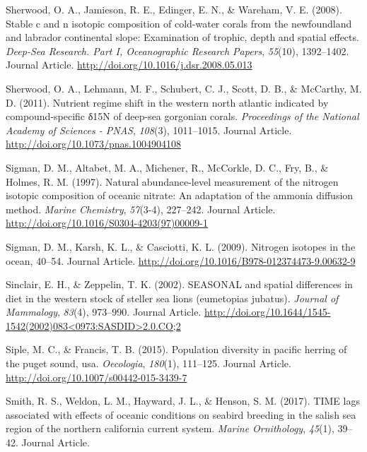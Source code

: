 \documentclass [11pt, proquest] {uwthesis}[2015/03/03]
\begin{document}
\hypertarget{ref-Sherwood2008}{}
Sherwood, O. A., Jamieson, R. E., Edinger, E. N., \& Wareham, V. E.
(2008). Stable c and n isotopic composition of cold-water corals from
the newfoundland and labrador continental slope: Examination of trophic,
depth and spatial effects. \emph{Deep-Sea Research. Part I,
Oceanographic Research Papers}, \emph{55}(10), 1392--1402. Journal
Article. \url{http://doi.org/10.1016/j.dsr.2008.05.013}

\hypertarget{ref-Sherwood2011}{}
Sherwood, O. A., Lehmann, M. F., Schubert, C. J., Scott, D. B., \&
McCarthy, M. D. (2011). Nutrient regime shift in the western north
atlantic indicated by compound-specific δ15N of deep-sea gorgonian
corals. \emph{Proceedings of the National Academy of Sciences - PNAS},
\emph{108}(3), 1011--1015. Journal Article.
\url{http://doi.org/10.1073/pnas.1004904108}

\hypertarget{ref-Sigman1997}{}
Sigman, D. M., Altabet, M. A., Michener, R., McCorkle, D. C., Fry, B.,
\& Holmes, R. M. (1997). Natural abundance-level measurement of the
nitrogen isotopic composition of oceanic nitrate: An adaptation of the
ammonia diffusion method. \emph{Marine Chemistry}, \emph{57}(3-4),
227--242. Journal Article.
\url{http://doi.org/10.1016/S0304-4203(97)00009-1}

\hypertarget{ref-Sigman2009}{}
Sigman, D. M., Karsh, K. L., \& Casciotti, K. L. (2009). Nitrogen
isotopes in the ocean, 40--54. Journal Article.
\url{http://doi.org/10.1016/B978-012374473-9.00632-9}

\hypertarget{ref-Sinclair2002}{}
Sinclair, E. H., \& Zeppelin, T. K. (2002). SEASONAL and spatial
differences in diet in the western stock of steller sea lions
(eumetopias jubatus). \emph{Journal of Mammalogy}, \emph{83}(4),
973--990. Journal Article.
\href{http://doi.org/10.1644/1545-1542(2002)083\%3C0973:SASDID\%3E2.0.CO;2}{http://doi.org/10.1644/1545-1542(2002)083\textless{}0973:SASDID\textgreater{}2.0.CO;2}

\hypertarget{ref-Siple2015}{}
Siple, M. C., \& Francis, T. B. (2015). Population diversity in pacific
herring of the puget sound, usa. \emph{Oecologia}, \emph{180}(1),
111--125. Journal Article.
\url{http://doi.org/10.1007/s00442-015-3439-7}

\hypertarget{ref-Smith2017}{}
Smith, R. S., Weldon, L. M., Hayward, J. L., \& Henson, S. M. (2017).
TIME lags associated with effects of oceanic conditions on seabird
breeding in the salish sea region of the northern california current
system. \emph{Marine Ornithology}, \emph{45}(1), 39--42. Journal
Article.
\end{document}
